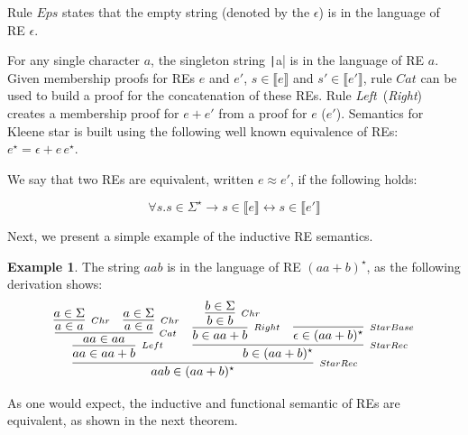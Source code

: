 \documentclass[oneside,12pt]{scrbook}
\theoremstyle{definition}
\newtheorem{Example}{Example}
\newcommand{\Eps}{\textit{Eps}}
\newcommand{\Catt}{\textit{Cat}}
\newcommand{\Left}{\textit{Left}}
\newcommand{\Right}{\textit{Right}}
\newcommand{\sembrackets}[1]{\ensuremath{\llbracket #1 \rrbracket}}
\newcommand{\coq}[1]{\texttt|#1|}
\theoremstyle{plain}
\theoremstyle{definition}
\begin{document}
Rule $\Eps$ states that the empty string (denoted by the $\epsilon$)
is in the language of RE $\epsilon$.

For any single character $a$, the singleton string \coq{a} is in the language 
of RE $a$. Given membership proofs for REs $e$ and $e'$, $s \in \sembrackets{e}$ 
and $s' \in\sembrackets{e'}$, rule $\Catt$ can be used to build a proof
for the concatenation of these REs.  Rule \Left~(\Right) creates a membership proof
for $e + e'$ from a proof for $e$ ($e'$). Semantics for Kleene star
is built using the following well known equivalence of REs: $e^\star
= \epsilon + e\,e^\star$. 

We say that two REs are equivalent, written $e\approx e'$, if the following holds:

\[
\forall s. s\in \Sigma^\star \to s \in\sembrackets{e} \leftrightarrow s\in\sembrackets{e'} 
\]

Next, we present a simple example of the inductive RE semantics.

\begin{Example}
	The string $aab$ is in the language of RE $(aa + b)^\star$, as the following derivation shows:
	\begin{equation*}
	\infer[_{StarRec}]{aab \in (aa + b)^\star}
	{
		\infer[_{Left}]{aa \in aa + b}
		{
			\infer[_{Cat}]{aa \in aa}
			{
				\infer[_{Chr}]{a \in a}{a \in \Sigma} &
				\infer[_{Chr}]{a \in a}{a \in \Sigma}
			}
		}
		&
		\infer[_{StarRec}]{b \in (aa + b)^\star}
		{
			\infer[_{Right}]{b \in aa + b}
			{
				\infer[_{Chr}]{b \in b}{b \in \Sigma}
			}
			&
			\infer[_{StarBase}]{\epsilon \in (aa + b)^\star}{}
		}
	}
	\end{equation*}
\end{Example}

As one would expect, the inductive and functional semantic of REs are equivalent, as shown in the next theorem.
\end{document}
